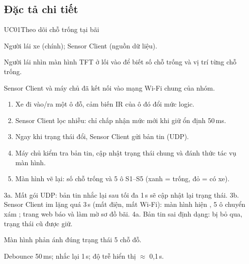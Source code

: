 \subsection{Đặc tả chi tiết}

\begin{usecase}{UC01}{Theo dõi chỗ trống tại bãi}
\item[Tác nhân] Người lái xe (chính); Sensor Client (nguồn dữ liệu).
\item[Mô tả] Người lái nhìn màn hình TFT ở lối vào để biết số chỗ trống và vị trí từng chỗ trống.
\item[Tiền điều kiện] Sensor Client và máy chủ đã kết nối vào mạng Wi-Fi chung của nhóm.
\item[Luồng chính] \begin{enumerate}[nosep,leftmargin=1.3em]
  \item Xe đi vào/ra một ô đỗ, cảm biến IR của ô đó đổi mức logic.
  \item Sensor Client lọc nhiễu: chỉ chấp nhận mức mới khi giữ ổn định 50\,ms.
  \item Ngay khi trạng thái đổi, Sensor Client gửi bản tin  (UDP).
  \item Máy chủ kiểm tra bản tin, cập nhật trạng thái chung và đánh thức tác vụ màn hình.
  \item Màn hình vẽ lại: số chỗ trống  và 5 ô S1–S5 (xanh = trống, đỏ = có xe).
\end{enumerate}
\item[Ngoại lệ] 3a. Mất gói UDP: bản tin nhắc lại sau tối đa 1\,s sẽ cập nhật lại trạng thái.
  3b. Sensor Client im lặng quá 3\,s (mất điện, mất Wi-Fi): màn hình hiện , 5 ô chuyển xám
      \code{----}; trang web báo  và làm mờ sơ đồ bãi.
  4a. Bản tin sai định dạng: bị bỏ qua, trạng thái cũ được giữ.
\item[Hậu điều kiện] Màn hình phản ánh đúng trạng thái 5 chỗ đỗ.
\item[Thông số] Debounce 50\,ms; nhắc lại 1\,s; độ trễ hiển thị $\approx$ 0,1\,s.
\end{usecase}

